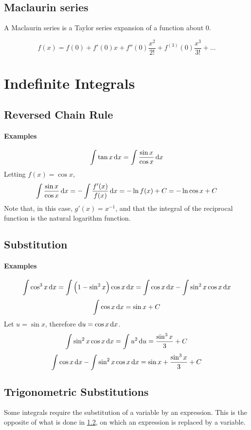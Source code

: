 \documentclass[oneside]{book}
\begin{document}
\subsection{Maclaurin series}
A Maclaurin series is a Taylor series expansion of a function about 0.

\[f\left(x\right) = f\left(0\right) + f'\left(0\right)x + f''\left(0\right)\frac{x^2}{2!} + f^{\left( 3 \right)}\left(0\right)\frac{x^3}{3!} + \ldots\]

\section{Indefinite Integrals}
\subsection{Reversed Chain Rule}
\paragraph{Examples}
\[\int \tan x \dif x = \int \frac{\sin{x}}{\cos{x}} \dif x\]
Letting \(f(x) = \cos x\),
\[\int \frac{\sin{x}}{\cos{x}} \dif x = - \int \frac{f'(x)}{f(x)} \dif x
= - \ln{f(x)} + C = - \ln{\cos x} + C\]
Note that, in this case, \(g'(x) = x^{-1}\), and that the integral of the
reciprocal function is the natural logarithm function.

\subsection{Substitution}\label{substitution}
\paragraph{Examples}
\[\int \cos^3 x \dif x
= \int \left( 1 - \sin^2 x \right) \cos x \dif x
= \int \cos x \dif x - \int \sin^2 x \cos x \dif x\]
\[\int \cos x \dif x = \sin x + C\]
Let \(u = \sin x\), therefore \(\dif u = \cos x \dif x\).
\[\int \sin^2 x \cos x \dif x = \int u^2 \dif u = \frac{\sin^3 x}{3} + C\]
\[\int \cos x \dif x - \int \sin^2 x \cos x \dif x
= \sin x + \frac{\sin^3 x}{3} + C\]

\subsection{Trigonometric Substitutions}
Some integrals require the substitution of a variable by an expression. This is
the opposite of what is done in \ref{substitution}, on which an expression is
replaced by a variable.
\end{document}
